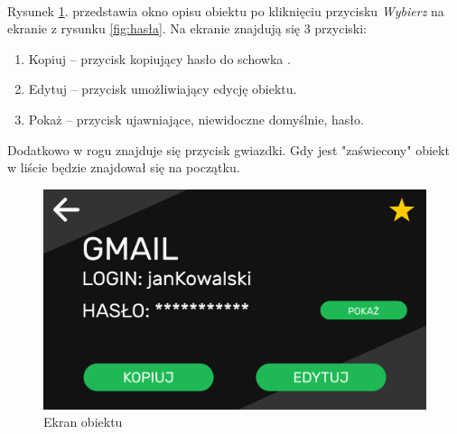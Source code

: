 \documentclass[a4paper]{article}
\begin{document}
\paragraph{}Rysunek \ref{fig:hasłaObiekt}. przedstawia okno opisu obiektu po kliknięciu przycisku \textit{Wybierz} na ekranie z rysunku \ref{fig:hasła}. Na ekranie znajdują się 3 przyciski:
\begin{enumerate}
    \item Kopiuj -- przycisk kopiujący hasło do schowka .
    \item Edytuj -- przycisk umożliwiający edycję obiektu.
    \item Pokaż -- przycisk ujawniające, niewidoczne domyślnie, hasło.
\end{enumerate}
Dodatkowo w rogu znajduje się przycisk gwiazdki. Gdy jest "zaświecony" obiekt w liście będzie znajdował się na początku.
\begin{figure}[H]
    \centering
    \includegraphics[width=1\textwidth]{img/ekran_obiektu.png}
    \caption{Ekran obiektu}
    \label{fig:hasłaObiekt}
\end{figure}

\newpage
\end{document}
